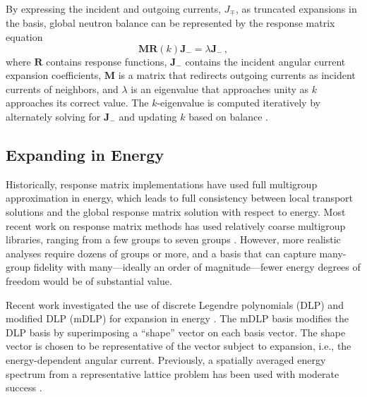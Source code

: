 \documentclass{anstrans}
\begin{document}
By expressing the incident and outgoing currents, $J_{\mp}$, as truncated
expansions in the basis, global neutron balance can be represented by the
response matrix equation
\begin{equation}
  \mathbf{M}\mathbf{R}(k)\mathbf{J_-}  = \lambda \mathbf{J_-} \, ,
\label{eq:erme}
\end{equation}
where $\mathbf{R}$ contains response functions, $\mathbf{J}_{-}$ contains the
incident angular current expansion coefficients, $\mathbf{M}$ is a matrix that
redirects outgoing currents as incident currents of neighbors, and $\lambda$ is
an eigenvalue that approaches unity as $k$ approaches its correct value. The
$k$-eigenvalue is computed iteratively by alternately solving for
$\mathbf{J}_{-}$ and updating $k$ based on balance \cite{RobertsSerment}.

\subsection{Expanding in Energy}

Historically, response matrix implementations have used full multigroup
approximation in energy, which leads to full consistency between local transport
solutions and the global response matrix solution with respect to energy. Most
recent work on response matrix methods has used relatively coarse multigroup
libraries, ranging from a few groups \cite{ishii2009tdd} to seven groups
\cite{forget2006tdh}. However, more realistic analyses require dozens of groups
or more, and a basis that can capture many-group fidelity with many---ideally an
order of magnitude---fewer energy degrees of freedom would be of substantial
value.

Recent work investigated the use of discrete Legendre polynomials (DLP) and
modified DLP (mDLP) for expansion in energy \cite{Roberts2014}.  The mDLP basis
modifies the DLP basis by superimposing a ``shape'' vector on each basis vector.
 The shape vector is chosen to be representative of the vector subject to
expansion, i.e., the energy-dependent angular current.  Previously, a spatially
averaged energy spectrum from a representative lattice problem has been used
with moderate success \cite{Roberts2014}.
\end{document}
